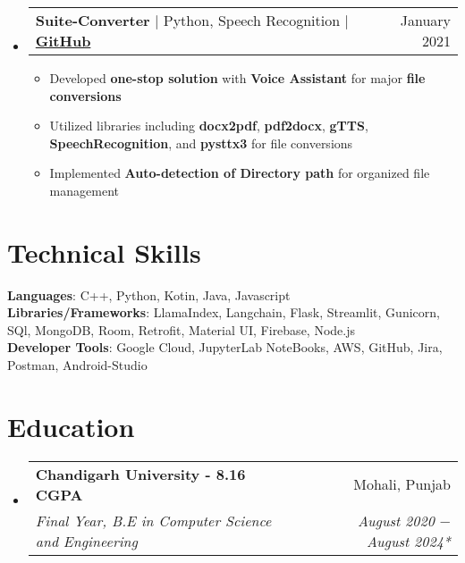 \documentclass[letterpaper,11pt]{article}
\makeatletter
\newcommand{\resumeItem}[1]{
  \item\small{
    {#1 \vspace{-2pt}}
  }
}
\newcommand{\resumeSubheading}[4]{
  \vspace{-2pt}\item
    \begin{tabular*}{0.97\textwidth}[t]{l@{\extracolsep{\fill}}r}
      \textbf{#1} & #2 \\
      \textit{\small#3} & \textit{\small #4} \\
    \end{tabular*}\vspace{-7pt}
}
\newcommand{\resumeProjectHeading}[2]{
    \item
    \begin{tabular*}{0.97\textwidth}{l@{\extracolsep{\fill}}r}
      \small#1 & #2 \\
    \end{tabular*}\vspace{-7pt}
}
\newcommand{\resumeSubHeadingListStart}{\begin{itemize}[leftmargin=0.15in, label={}]}
\newcommand{\resumeSubHeadingListEnd}{\end{itemize}}
\newcommand{\resumeItemListStart}{\begin{itemize}}
\newcommand{\resumeItemListEnd}{\end{itemize}\vspace{-5pt}}
\makeatother
\begin{document}

 \resumeSubHeadingListStart
      \resumeProjectHeading
          {\textbf{Suite-Converter } $|${ Python, Speech Recognition} $|$ \textbf{\href{https://github.com/aniketk13/Suite-Converter}{GitHub}} }{January 2021}
          \resumeItemListStart
          \resumeItem{Developed \textbf{one-stop solution} with \textbf{Voice Assistant} for major \textbf{file conversions}}
          \resumeItem{Utilized libraries including \textbf{docx2pdf}, \textbf{pdf2docx}, \textbf{gTTS}, \textbf{SpeechRecognition}, and \textbf{pysttx3} for file conversions}
          \resumeItem{Implemented \textbf{Auto-detection of Directory path} for organized file management}
          \resumeItemListEnd
    \resumeSubHeadingListEnd    
\section{\textbf{Technical Skills}}
 \begin{itemize}[leftmargin=0.15in, label={}]
    \small{\item{
     \textbf{Languages}{: C++, Python, Kotin, Java, Javascript} \\
     \textbf{Libraries/Frameworks}{: LlamaIndex, Langchain, Flask, Streamlit, Gunicorn, SQl, MongoDB, Room, Retrofit, Material UI, Firebase, Node.js } \\
     \textbf{Developer Tools}{: Google Cloud, JupyterLab NoteBooks, AWS, GitHub, Jira, Postman, Android-Studio}
    }} 
 \end{itemize}

\section{\textbf{Education}}
  \resumeSubHeadingListStart
    \resumeSubheading
      {Chandigarh University - 8.16 CGPA}{Mohali, Punjab}
      {Final Year, B.E in Computer Science and Engineering}{August 2020 $-$ August 2024*}
  \resumeSubHeadingListEnd
  
\end{document}
